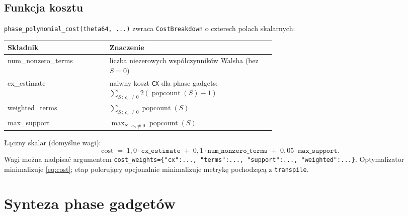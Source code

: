 \documentclass[11pt,a4paper]{article}
\newcommand{\1}{\mathbf{1}}
\newcommand{\popcount}{\operatorname{popcount}}
\newcommand{\code}[1]{\texttt{#1}}
\begin{document}
\subsection{Funkcja kosztu}
\label{sec:cost}

\code{phase\_polynomial\_cost(theta64, ...)} zwraca
\code{CostBreakdown} o czterech polach skalarnych:

\begin{center}
\begin{tabular}{>{\ttfamily}l p{0.62\linewidth}}
\toprule
\rmfamily\textbf{Składnik} & \textbf{Znaczenie}\\
\midrule
num\_nonzero\_terms & liczba niezerowych współczynników Walsha (bez $S=0$)\\
cx\_estimate        & naiwny koszt \code{CX} dla phase gadgets:
                       $\displaystyle \sum_{S\,:\,c_{S}\neq 0} 2(\popcount(S)-1)$\\
weighted\_terms     & $\displaystyle \sum_{S\,:\,c_{S}\neq 0} \popcount(S)$\\
max\_support        & $\displaystyle \max_{S\,:\,c_{S}\neq 0} \popcount(S)$\\
\bottomrule
\end{tabular}
\end{center}

\noindent
Łączny skalar (domyślne wagi):
\begin{equation}
\label{eq:cost}
\mathrm{cost} \;=\; 1{,}0\cdot\code{cx\_estimate}
\;+\; 0{,}1\cdot\code{num\_nonzero\_terms}
\;+\; 0{,}05\cdot\code{max\_support}.
\end{equation}
Wagi można nadpisać argumentem
\code{cost\_weights=\{"cx":..., "terms":..., "support":..., "weighted":...\}}.
Optymalizator minimalizuje \eqref{eq:cost}; etap polerujący opcjonalnie
minimalizuje metrykę pochodzącą z \code{transpile}.

\section{Synteza phase gadgetów}
\label{sec:gadgets}
\end{document}
